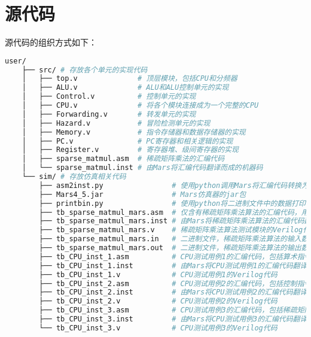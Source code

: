 \section{源代码}
源代码的组织方式如下：
\begin{lstlisting}[language={bash}, numbers=none]
    user/
    ├── src/ # 存放各个单元的实现代码
    │   ├── top.v              # 顶层模块，包括CPU和分频器
    │   ├── ALU.v              # ALU和ALU控制单元的实现
    │   ├── Control.v          # 控制单元的实现
    │   ├── CPU.v              # 将各个模块连接成为一个完整的CPU
    │   ├── Forwarding.v       # 转发单元的实现
    │   ├── Hazard.v           # 冒险检测单元的实现
    │   ├── Memory.v           # 指令存储器和数据存储器的实现
    │   ├── PC.v               # PC寄存器和相关逻辑的实现
    │   ├── Register.v         # 寄存器堆、级间寄存器的实现
    │   ├── sparse_matmul.asm  # 稀疏矩阵乘法的汇编代码
    │   └── sparse_matmul.inst # 由Mars将汇编代码翻译而成的机器码
    └── sim/ # 存放仿真相关代码
        ├── asm2inst.py                # 使用python调用Mars将汇编代码转换为机器码
        ├── Mars4_5.jar                # Mars仿真器的jar包
        ├── printbin.py                # 使用python将二进制文件中的数据打印出来
        ├── tb_sparse_matmul_mars.asm  # 仅含有稀疏矩阵乘法算法的汇编代码，用于统计指令数
        ├── tb_sparse_matmul_mars.inst # 由Mars将稀疏矩阵乘法算法的汇编代码翻译成的机器码
        ├── tb_sparse_matmul_mars.v    # 稀疏矩阵乘法算法测试模块的Verilog代码
        ├── tb_sparse_matmul_mars.in   # 二进制文件，稀疏矩阵乘法算法的输入数据
        ├── tb_sparse_matmul_mars.out  # 二进制文件，稀疏矩阵乘法算法的输出数据
        ├── tb_CPU_inst_1.asm          # CPU测试用例1的汇编代码，包括算术指令和转发
        ├── tb_CPU_inst_1.inst         # 由Mars将CPU测试用例1的汇编代码翻译成的机器码
        ├── tb_CPU_inst_1.v            # CPU测试用例1的Verilog代码
        ├── tb_CPU_inst_2.asm          # CPU测试用例2的汇编代码，包括控制指令和冒险
        ├── tb_CPU_inst_2.inst         # 由Mars将CPU测试用例2的汇编代码翻译成的机器码
        ├── tb_CPU_inst_2.v            # CPU测试用例2的Verilog代码
        ├── tb_CPU_inst_3.asm          # CPU测试用例3的汇编代码，包括稀疏矩阵乘法和BCD7显示
        ├── tb_CPU_inst_3.inst         # 由Mars将CPU测试用例3的汇编代码翻译成的机器码
        └── tb_CPU_inst_3.v            # CPU测试用例3的Verilog代码
\end{lstlisting}


